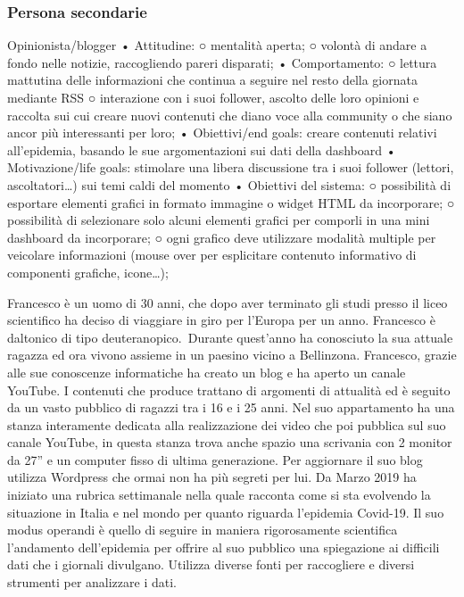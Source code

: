 \subsubsection*{Persona secondarie}
Opinionista/blogger
	• Attitudine:
		○ mentalità aperta;
		○ volontà di andare a fondo nelle notizie, raccogliendo pareri disparati;
	• Comportamento: 
		○ lettura mattutina delle informazioni che continua a seguire nel resto della giornata mediante RSS
		○ interazione con i suoi follower, ascolto delle loro opinioni e raccolta sui cui creare nuovi contenuti che diano voce alla community o che siano ancor più interessanti per loro;
	• Obiettivi/end goals: creare contenuti relativi all'epidemia, basando le sue argomentazioni sui dati della dashboard
	• Motivazione/life goals: stimolare una libera discussione tra i suoi follower (lettori, ascoltatori…) sui temi caldi del momento
	• Obiettivi del sistema:
		○ possibilità di esportare elementi grafici in formato immagine o widget HTML da incorporare;
		○ possibilità di selezionare solo alcuni elementi grafici per comporli in una mini dashboard da incorporare; 
		○ ogni grafico deve utilizzare modalità multiple per veicolare informazioni (mouse over per esplicitare contenuto informativo di componenti grafiche, icone…); 

Francesco è un uomo di 30 anni, che dopo aver terminato gli studi presso il liceo scientifico ha deciso di viaggiare in giro per l'Europa per un anno. Francesco è daltonico di tipo deuteranopico. Durante quest'anno ha conosciuto la sua attuale ragazza ed ora vivono assieme in un paesino vicino a Bellinzona. Francesco, grazie alle sue conoscenze informatiche ha creato un blog e ha aperto un canale YouTube. I contenuti che produce trattano di argomenti di attualità ed è seguito da un vasto pubblico di ragazzi tra i 16 e i 25 anni. Nel suo appartamento ha una stanza interamente  dedicata alla realizzazione dei video che poi pubblica sul suo canale YouTube, in questa stanza trova anche spazio una scrivania con 2 monitor da 27'' e un computer fisso di ultima generazione. Per aggiornare il suo blog utilizza Wordpress che ormai non ha più segreti per lui.
Da Marzo 2019 ha iniziato una rubrica settimanale nella quale racconta come si sta evolvendo la situazione in Italia e nel mondo per quanto riguarda l'epidemia Covid-19.  Il suo modus operandi è quello di seguire in maniera rigorosamente scientifica l'andamento dell'epidemia per offrire al suo pubblico una spiegazione ai difficili dati che i giornali divulgano. Utilizza diverse fonti per raccogliere e diversi strumenti per analizzare i dati. 
